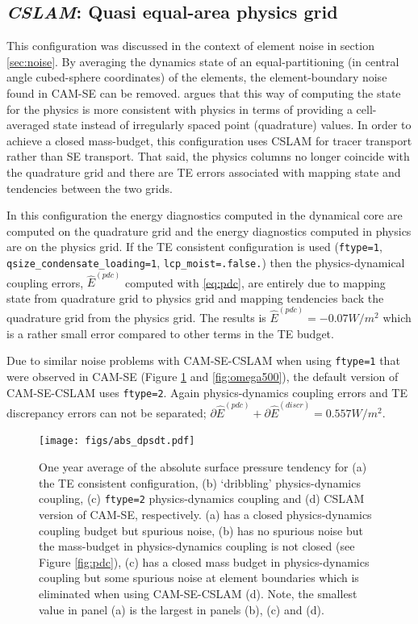 \documentclass{agujournal}
\newcommand*{\gi}[1]{\widehat{#1}}
\begin{document}
\subsection{{\em{CSLAM}}: Quasi equal-area physics grid}\label{sec:cslam}
This configuration was discussed in the context of element noise in section \ref{sec:noise}. By averaging the dynamics state of an equal-partitioning (in central angle cubed-sphere coordinates) of the elements, the element-boundary noise found in CAM-SE can be removed. \cite{LetAl2018JAMES} argues that this way of computing the state for the physics is more consistent with physics in terms of providing a cell-averaged state instead of irregularly spaced point (quadrature) values. In order to achieve a closed mass-budget, this configuration uses CSLAM for tracer transport rather than SE transport. That said, the physics columns no longer coincide with the quadrature grid and there are TE errors associated with mapping state and tendencies between the two grids.

In this configuration the energy diagnostics computed in the dynamical core are computed on the quadrature grid and the energy diagnostics computed in physics are on the physics grid. If the TE consistent configuration is used ({\tt{ftype=1}}, {\tt{qsize\_condensate\_loading=1}}, {\tt{lcp\_moist=.false.}}) then the physics-dynamical coupling errors, $\gi{E}^{(pdc)}$ computed with \eqref{eq:pdc}, are entirely due to mapping state from quadrature grid to physics grid and mapping tendencies back the quadrature grid from the physics grid. The results is $\gi{E}^{(pdc)}=-0.07W/m^2$ which is a rather small error compared to other terms in the TE budget.

Due to similar noise problems with CAM-SE-CSLAM when using {\tt{ftype=1}} that were observed in CAM-SE (Figure \ref{fig:abs_dpsdt} and \ref{fig:omega500}), the default version of CAM-SE-CSLAM uses {\tt{ftype=2}}. Again physics-dynamics coupling errors and TE discrepancy errors can not be separated; $\partial \gi{E}^{({pdc})}+\partial \gi{E}^{({discr})} = 0.557W/m^2$.

 \begin{figure}
 \centering
 \texttt{[image: figs/abs\_dpsdt.pdf]}
 \caption{One year average of the absolute surface pressure tendency for (a) the TE consistent configuration, (b) `dribbling' physics-dynamics coupling, (c) {\tt{ftype=2}} physics-dynamics coupling and (d) CSLAM version of CAM-SE, respectively. (a) has a closed physics-dynamics coupling budget but spurious noise, (b) has no spurious noise but the mass-budget in physics-dynamics coupling is not closed (see Figure \ref{fig:pdc}), (c) has a closed mass budget in physics-dynamics coupling but some spurious noise at element boundaries which is eliminated when using CAM-SE-CSLAM (d). Note, the smallest value in panel (a) is the largest in panels (b), (c) and (d).}
 \label{fig:abs_dpsdt}
  \end{figure}
\end{document}
